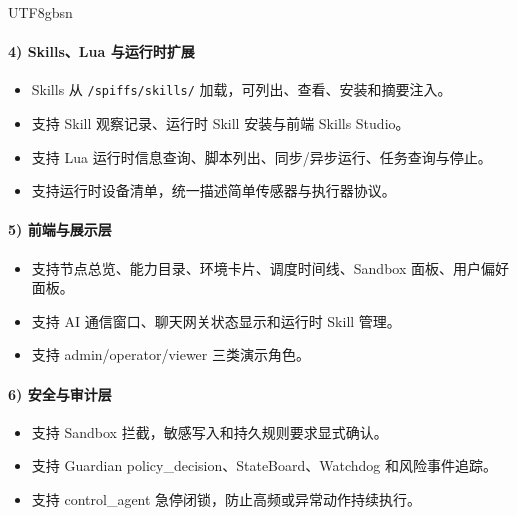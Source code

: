 \documentclass[a4paper,12pt]{article}
\begin{document}
\begin{CJK*}{UTF8}{gbsn}
\paragraph{4) Skills、Lua 与运行时扩展}
\begin{itemize}
  \item Skills 从 \texttt{/spiffs/skills/} 加载，可列出、查看、安装和摘要注入。
  \item 支持 Skill 观察记录、运行时 Skill 安装与前端 Skills Studio。
  \item 支持 Lua 运行时信息查询、脚本列出、同步/异步运行、任务查询与停止。
  \item 支持运行时设备清单，统一描述简单传感器与执行器协议。
\end{itemize}

\paragraph{5) 前端与展示层}
\begin{itemize}
  \item 支持节点总览、能力目录、环境卡片、调度时间线、Sandbox 面板、用户偏好面板。
  \item 支持 AI 通信窗口、聊天网关状态显示和运行时 Skill 管理。
  \item 支持 admin/operator/viewer 三类演示角色。
\end{itemize}

\paragraph{6) 安全与审计层}
\begin{itemize}
  \item 支持 Sandbox 拦截，敏感写入和持久规则要求显式确认。
  \item 支持 Guardian policy\_decision、StateBoard、Watchdog 和风险事件追踪。
  \item 支持 control\_agent 急停闭锁，防止高频或异常动作持续执行。
\end{itemize}


\end{CJK*}
\end{document}
